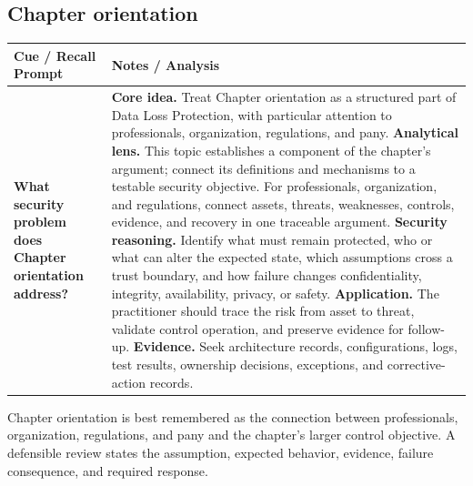 \documentclass[11pt]{article}
\newcommand{\CornellHeader}{%
\rowcolor{Navy}\color{white}\bfseries Cue / Recall Prompt & \color{white}\bfseries Notes / Analysis\\\hline}
\newcommand{\CornellRow}[2]{%
\cellcolor{CueGray}\RaggedRight\textbf{#1} & \RaggedRight #2\\\hline}
\begin{document}
\subsection*{Chapter orientation}
\begin{longtable}{>{\RaggedRight\arraybackslash}p{}|>{\RaggedRight\arraybackslash}p{}}
\CornellHeader
\CornellRow{What security problem does Chapter orientation address?}{\textbf{Core idea.} Treat Chapter orientation as a structured part of Data Loss Protection, with particular attention to professionals, organization, regulations, and pany. \textbf{Analytical lens.} This topic establishes a component of the chapter's argument; connect its definitions and mechanisms to a testable security objective. For professionals, organization, and regulations, connect assets, threats, weaknesses, controls, evidence, and recovery in one traceable argument. \textbf{Security reasoning.} Identify what must remain protected, who or what can alter the expected state, which assumptions cross a trust boundary, and how failure changes confidentiality, integrity, availability, privacy, or safety. \textbf{Application.} The practitioner should trace the risk from asset to threat, validate control operation, and preserve evidence for follow-up. \textbf{Evidence.} Seek architecture records, configurations, logs, test results, ownership decisions, exceptions, and corrective-action records.}
\end{longtable}
\begin{topicsummary}
Chapter orientation is best remembered as the connection between professionals, organization, regulations, and pany and the chapter's larger control objective. A defensible review states the assumption, expected behavior, evidence, failure consequence, and required response.
\end{topicsummary}
\end{document}

